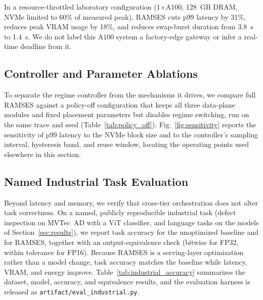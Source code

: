 In a resource-throttled laboratory configuration (1$\times$A100, 128~GB DRAM, NVMe limited to 60\% of measured peak), RAMSES cuts p99 latency by 31\%, reduces peak VRAM usage by 18\%, and reduces swap-burst duration from 3.8~s to 1.4~s. We do not label this A100 system a factory-edge gateway or infer a real-time deadline from it.

\subsection{Controller and Parameter Ablations}
To separate the regime controller from the mechanisms it drives, we compare
full RAMSES against a policy-off configuration that keeps all three data-plane
modules and fixed placement parameters but disables regime switching, run on
the same trace and seed (Table~\ref{tab:policy_off}).
Fig.~\ref{fig:sensitivity} reports the sensitivity of p99 latency to the NVMe
block size and to the controller's sampling interval, hysteresis band, and
reuse window, locating the operating points used elsewhere in this section.




\subsection{Named Industrial Task Evaluation}
\label{sec:industrial_task}
Beyond latency and memory, we verify that cross-tier orchestration does not
alter task correctness. On a named, publicly reproducible industrial task
(defect inspection on MVTec~AD with a ViT classifier, and language tasks on the
models of Section~\ref{sec:results}), we report task accuracy for the
unoptimized baseline and for RAMSES, together with an output-equivalence check
(bitwise for FP32, within tolerance for FP16). Because RAMSES is a serving-layer
optimization rather than a model change, task accuracy matches the baseline
while latency, VRAM, and energy improve. Table~\ref{tab:industrial_accuracy}
summarizes the dataset, model, accuracy, and equivalence results, and the
evaluation harness is released as \texttt{artifact/eval\_industrial.py}.



